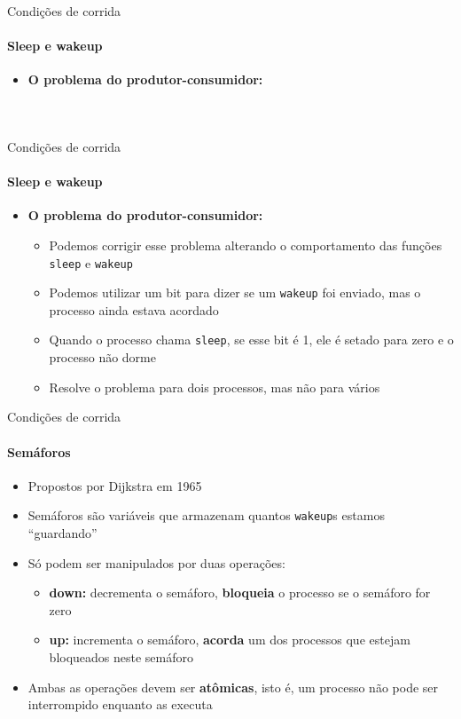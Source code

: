 \documentclass{beamer}
\begin{document}
\begin{frame}{Condições de corrida}
	\framesubtitle{Sleep e wakeup}
	\begin{itemize}
		\item \textbf{O problema do produtor-consumidor:}
		\begin{columns}
			\begin{column}{0.5\textwidth}
				\inputminted[fontsize=\footnotesize]{c}{resources/producer.c}
			\end{column}
			\begin{column}{0.5\textwidth}
				\inputminted[fontsize=\footnotesize]{c}{resources/consumidor.c}
			\end{column}
		\end{columns}
	\end{itemize}
\end{frame}
\begin{frame}{Condições de corrida}
	\framesubtitle{Sleep e wakeup}
	\begin{itemize}
		\item \textbf{O problema do produtor-consumidor:}
		\begin{itemize}
			\item Podemos corrigir esse problema alterando o comportamento das funções \texttt{sleep} e \texttt{wakeup}
			\item Podemos utilizar um bit para dizer se um \texttt{wakeup} foi enviado, mas o processo ainda estava acordado
			\item Quando o processo chama \texttt{sleep}, se esse bit é 1, ele é setado para zero e o processo não dorme
			\item Resolve o problema para dois processos, mas não para vários
		\end{itemize}
	\end{itemize}
\end{frame}
\begin{frame}{Condições de corrida}
	\framesubtitle{Semáforos}
	\begin{itemize}
		\item Propostos por Dijkstra em 1965
		\item Semáforos são variáveis que armazenam quantos \texttt{wakeup}s estamos ``guardando''
		\item Só podem ser manipulados por duas operações:
		\begin{itemize}
			\item \textbf{down:} decrementa o semáforo, \textbf{bloqueia} o processo se o semáforo for zero
			\item \textbf{up:} incrementa o semáforo, \textbf{acorda} um dos processos que estejam bloqueados neste semáforo
		\end{itemize}
		\item Ambas as operações devem ser \textbf{atômicas}, isto é, um processo não pode ser interrompido enquanto as executa
	\end{itemize}
\end{frame}
\end{document}
